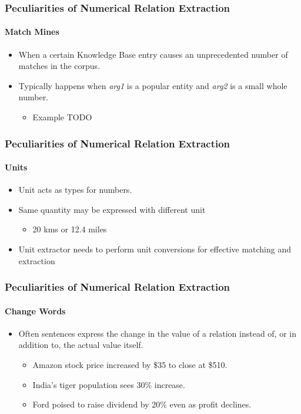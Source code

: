 \documentclass{beamer}
\begin{document}
\begin{frame}
\frametitle{Peculiarities of Numerical Relation Extraction}
\framesubtitle{Match Mines}

\begin{itemize}

\item When a certain Knowledge Base entry causes an unprecedented number of matches in the corpus.

\item Typically happens when \emph{arg1} is a popular entity and \emph{arg2} is a small whole number.
	\begin{itemize}
		\item Example TODO
	\end{itemize}
\end{itemize}

\end{frame}
\begin{frame}
\frametitle{Peculiarities of Numerical Relation Extraction}
\framesubtitle{Units}
\begin{itemize}
\item Unit acts as types for numbers.
\item Same quantity may be expressed with different unit
	\begin{itemize}
    	\item 20 kms or 12.4 miles
   	\end{itemize}
\item Unit extractor needs to perform unit conversions for effective matching and extraction
\end{itemize}
\end{frame}

\begin{frame}
\frametitle{Peculiarities of Numerical Relation Extraction}
\framesubtitle{Change Words}

\begin{itemize}
\item Often sentences express the change in the value of a relation instead of, or in addition to, the actual value itself.
\begin{itemize}
\item Amazon stock price increased by \$35 to close at \$510.
\item India's tiger population sees 30\% increase.
\item Ford poised to raise dividend by 20\% even as profit declines.
\end{itemize}
\end{itemize}
\end{frame}
\end{document}
